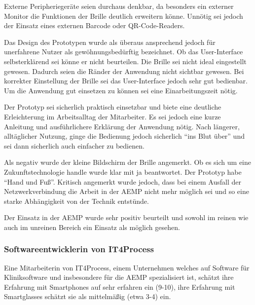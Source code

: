 Externe Peripheriegeräte seien durchaus denkbar, da besonders ein externer Monitor die Funktionen der Brille deutlich erweitern könne. Unnötig sei jedoch der Einsatz eines externen Barcode oder QR-Code-Readers.

Das Design des Prototypen wurde als überaus ansprechend jedoch für unerfahrene Nutzer als gewöhnungsbedürftig bezeichnet. Ob das User-Interface selbsterklärend sei könne er nicht beurteilen. Die Brille sei nicht ideal eingestellt gewesen. Dadurch seien die Ränder der Anwendung nicht sichtbar gewesen. Bei korrekter Einstellung der Brille sei das User-Interface jedoch sehr gut bedienbar. Um die Anwendung gut einsetzen zu können sei eine Einarbeitungszeit nötig. 

Der Prototyp sei sicherlich praktisch einsetzbar und biete eine deutliche Erleichterung im Arbeitsalltag der Mitarbeiter. Es sei jedoch eine kurze Anleitung und ausführlichere Erklärung der Anwendung nötig. Nach längerer, alltäglicher Nutzung, ginge die Bedienung jedoch sicherlich \enquote{ins Blut über} und sei dann sicherlich auch einfacher zu bedienen. 

Als negativ wurde der kleine Bildschirm der Brille angemerkt. Ob es sich um eine Zukunftstechnologie handle wurde klar mit ja beantwortet. Der Prototyp habe \enquote{Hand und Fuß}. Kritisch angemerkt wurde jedoch, dass bei einem Ausfall der Netzwerkverbindung die Arbeit in der AEMP nicht mehr möglich sei und so eine starke Abhängigkeit von der Technik entstünde.

Der Einsatz in der AEMP wurde sehr positiv beurteilt und sowohl im reinen wie auch im unreinen Bereich ein Einsatz als möglich gesehen.
%
%
\subsubsection{Softwareentwicklerin von IT4Process}
%
Eine Mitarbeiterin von IT4Process, einem Unternehmen welches auf Software für Kliniksoftware und insbesondere für die AEMP spezialisiert ist, schätzt ihre Erfahrung mit Smartphones auf sehr erfahren ein (9-10), ihre Erfahrung mit Smartglasses schätzt sie als mittelmäßig (etwa 3-4) ein. 

